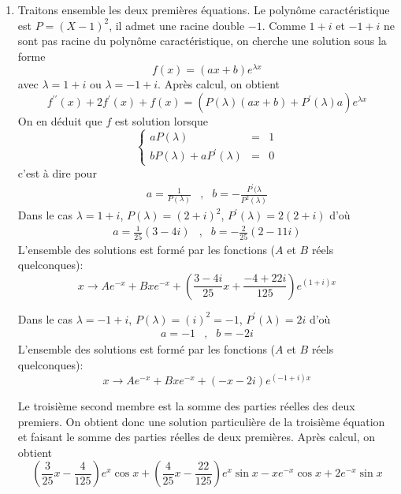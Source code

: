 \begin{enumerate}
 \item Traitons ensemble les deux premières équations.\newline
Le polynôme caractéristique est $P=(X-1)^2$, il admet une racine double $-1$. Comme $1+i$ et $-1+i$ ne sont pas racine du polynôme caractéristique, on cherche une solution sous la forme
\[f(x)=(ax+b)e^{\lambda x}\]
avec $\lambda=1+i$ ou $\lambda=-1+i$. Après calcul, on obtient
\[f^{\prime \prime}(x) + 2f^\prime (x)+f(x)=\left( P(\lambda)(ax +b)+ P^\prime (\lambda)a\right)e^{\lambda x} \]
On en déduit que $f$ est solution lorsque
\begin{displaymath}
\left\lbrace \begin{array}{lll}
aP(\lambda) & = & 1 \\ 
bP(\lambda)+aP^\prime (\lambda) & = & 0
  \end{array}\right. 
  \end{displaymath}
c'est à dire pour
\begin{eqnarray*}
a=\frac{1}{P(\lambda)} &,& b=-\frac{P^\prime(\lambda}{P^2(\lambda)} 
\end{eqnarray*}
Dans le cas $\lambda=1+i$, $P(\lambda)=(2+i)^2$, $P^\prime (\lambda)=2(2+i)$ d'où
\begin{eqnarray*}
a=\frac{1}{25}(3-4i) &,& b=-\frac{2}{25}(2-11i)
\end{eqnarray*}
L'ensemble des solutions est formé par les fonctions ($A$ et  $B$ réels quelconques):
\begin{displaymath}
 x\rightarrow Ae^{-x} + Bxe^{-x} + \left( \frac{3-4i}{25}x + \frac{-4+22i}{125}\right) e^{(1+i)x}
\end{displaymath}

Dans le cas $\lambda=-1+i$, $P(\lambda)=(i)^2=-1$, $P^\prime (\lambda)=2i$ d'où
\begin{eqnarray*}
a=-1 &,& b=-2i
\end{eqnarray*}
L'ensemble des solutions est formé par les fonctions ($A$ et  $B$ réels quelconques):
\begin{displaymath}
 x\rightarrow Ae^{-x} + Bxe^{-x} +  (-x-2i) e^{(-1+i)x}
\end{displaymath}

Le troisième second membre est la somme des parties réelles des deux premiers. On obtient donc une solution particulière de la troisième équation et faisant le somme des parties réelles de deux premières. Après calcul, on obtient
\begin{displaymath}
 \left( \frac{3}{25}x -\dfrac{4}{125}\right) e^{x}\cos x  
+ \left( \frac{4}{25}x -\dfrac{22}{125}\right)e^{x}\sin x
-xe^{-x}\cos x +2e^{-x}\sin x
\end{displaymath}


\end{enumerate}
